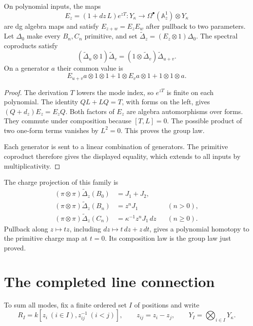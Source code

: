 \begin{proposition}\label{cbc:cf:spectral}
On polynomial inputs, the maps
\[
 E_z=(1+dz\,L)e^{zT}:
 Y_\kappa\longrightarrow
 \Omega^\bullet(\mathbb A^1_z)\otimes Y_\kappa
\]
are dg algebra maps and satisfy $E_{z+w}=E_zE_w$ after
pullback to two parameters. Let $\Delta_0$ make every $B_n,C_n$
primitive, and set
$\widetilde\Delta_z=(E_z\otimes1)\Delta_0$.
The spectral coproducts satisfy
\[
 (\widetilde\Delta_u\otimes1)\widetilde\Delta_v
       =(1\otimes\widetilde\Delta_v)\widetilde\Delta_{u+v}.
\]
On a generator $a$ their common value is
\[
 E_{u+v}a\otimes1\otimes1+
 1\otimes E_va\otimes1+1\otimes1\otimes a.
\]
\end{proposition}
\begin{proof}
The derivation $T$ lowers the mode index, so $e^{zT}$ is finite
on each polynomial. The identity $QL+LQ=T$, with forms on the
left, gives $(Q+d_z)E_z=E_zQ$. Both factors of $E_z$ are
algebra automorphisms over forms. They commute under composition
because $[T,L]=0$. The possible product of two one-form terms
vanishes by $L^2=0$. This proves the group law.

Each generator is sent to a linear combination of generators.
The primitive coproduct therefore gives the displayed equality,
which extends to all inputs by multiplicativity.
\end{proof}

The charge projection of this family is
\begin{align*}
 (\pi\otimes\pi)\widetilde\Delta_z(B_0)&=J_1+J_2,\\
 (\pi\otimes\pi)\widetilde\Delta_z(B_n)&=z^nJ_1
                                      &&(n>0),\\
 (\pi\otimes\pi)\widetilde\Delta_z(C_n)&=
                  \kappa^{-1}z^nJ_1\,dz &&(n\geq0).
\end{align*}
Pullback along $z\mapsto tz$, including
$dz\mapsto t\,dz+z\,dt$, gives a polynomial homotopy
to the primitive charge map at $t=0$. Its composition law
is the group law just proved.

\section{The completed line connection}
\label{cbc:cf:completion}

To sum all modes, fix a finite ordered set $I$ of positions and
write
\[
 R_I=k[z_i\ (i\in I),z_{ij}^{-1}\ (i<j)],
 \qquad z_{ij}=z_i-z_j,\qquad
 Y_I=\bigotimes_{i\in I}Y_\kappa.
\]

